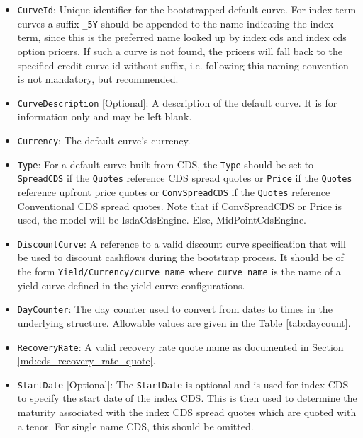 \begin{itemize}
\item
\lstinline!CurveId!: Unique identifier for the bootstrapped default curve. For index term curves a suffix \lstinline!_5Y! should be appended to the name indicating the index term, since this is the preferred name looked up by index cds and index cds option pricers. If such a curve is not found, the pricers will fall back to the specified credit curve id without suffix, i.e. following this naming convention is not mandatory, but recommended.

\item \lstinline!CurveDescription! [Optional]:
A description of the default curve. It is for information only and may be left blank.

\item \lstinline!Currency!:
The default curve's currency.

\item \lstinline!Type!:
For a default curve built from CDS, the \lstinline!Type! should be set to \lstinline!SpreadCDS! if the \lstinline!Quotes! reference CDS spread quotes or \lstinline!Price! if the \lstinline!Quotes! reference upfront price quotes or \lstinline!ConvSpreadCDS! if the \lstinline!Quotes! reference Conventional CDS spread quotes.  Note that if ConvSpreadCDS or Price is used, the model will be IsdaCdsEngine. Else, MidPointCdsEngine.

\item \lstinline!DiscountCurve!:
A reference to a valid discount curve specification that will be used to discount cashflows during the bootstrap process. It should be of the form \lstinline!Yield/Currency/curve_name! where \lstinline!curve_name! is the name of a yield curve defined in the yield curve configurations.

\item \lstinline!DayCounter!:
The day counter used to convert from dates to times in the underlying structure. Allowable values are given in the Table \ref{tab:daycount}.

\item \lstinline!RecoveryRate!:
A valid recovery rate quote name as documented in Section \ref{md:cds_recovery_rate_quote}.

\item \lstinline!StartDate! [Optional]:
The \lstinline!StartDate! is optional and is used for index CDS to specify the start date of the index CDS. This is then used to determine the maturity associated with the index CDS spread quotes which are quoted with a tenor. For single name CDS, this should be omitted.


\end{itemize}
